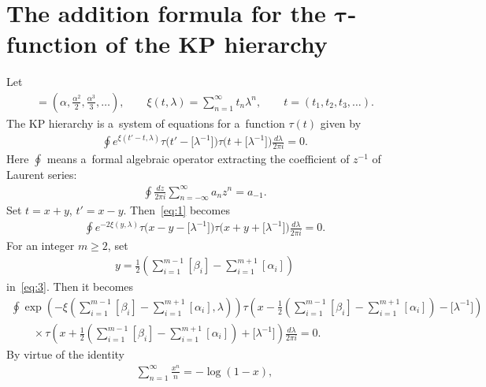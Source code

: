 \documentclass[pdftex]{sigma}
\begin{document}
\section[The addition formula for the $\tau$-function of the KP hierarchy]{The addition formula for the $\boldsymbol{\tau}$-function of the KP hierarchy} \label{section2}

Let
\begin{gather*}
[\alpha]=\left(\alpha,\frac{\alpha^2}{2},\frac{\alpha^3}{3},\dots\right),
\qquad
\xi(t,\lambda)=\sum_{n=1}^{\infty}t_n\lambda^n,
\qquad
t=(t_1,t_2,t_3,\dots).
\end{gather*}
The KP hierarchy is a~system of equations for a~function $\tau(t)$ \cite{DJKM1,JM1, MJD1} given by
\begin{gather}
\oint e^{\xi(t'-t,\lambda)}\tau\big(t'-\big[\lambda^{-1}\big]\big)\tau\big(t+\big[\lambda^{-1}\big]\big)\frac{d\lambda}{2\pi i}=0.
\label{eq:1}
\end{gather}
Here $\oint$ means a~formal algebraic operator extracting the coef\/f\/icient of $z^{-1}$ of Laurent series:
\begin{gather*}%
\oint\frac{dz}{2\pi i}\sum_{n=-\infty}^{\infty}a_n z^n=a_{-1}.
\end{gather*}
Set $t=x+y$, $t'=x-y$.
Then~\eqref{eq:1} becomes
\begin{gather}
\oint e^{-2\xi(y,\lambda)}\tau\big(x-y-\big[\lambda^{-1}\big]\big)\tau\big(x+y+\big[\lambda^{-1}\big]\big)\frac{d\lambda}{2\pi i}=0.
\label{eq:3}
\end{gather}
For an integer $m\ge2$, set
\begin{gather}
y=\frac{1}{2}\left(\sum_{i=1}^{m-1}[\beta_i]-\sum_{i=1}^{m+1}[\alpha_i]\right)
\label{eq:22}
\end{gather}
in~\eqref{eq:3}. Then it becomes
\begin{gather}
\oint\exp\left({-\xi\left(\displaystyle\sum_{i=1}^{m-1}[\beta_i]-\sum_{i=1}^{m+1}[\alpha_i],\lambda\right)}\right)
\tau\left(x-\frac{1}{2}\left(\sum_{i=1}^{m-1}[\beta_i]-\sum_{i=1}^{m+1}[\alpha_i]\right)-\big[\lambda^{-1}
\big]\right)\nonumber
\\
\qquad
{}\times\tau\left(x+\frac{1}{2}\left(\sum_{i=1}^{m-1}[\beta_i]-\sum_{i=1}^{m+1}[\alpha_i]\right)+\big[\lambda^{-1}
\big]\right)\frac{d\lambda}{2\pi i}=0.
\label{eq:4}
\end{gather}
By virtue of the identity
\begin{gather*}
\sum_{n=1}^{\infty}\frac{x^n}{n}=-\log(1-x),
\end{gather*}
\end{document}
